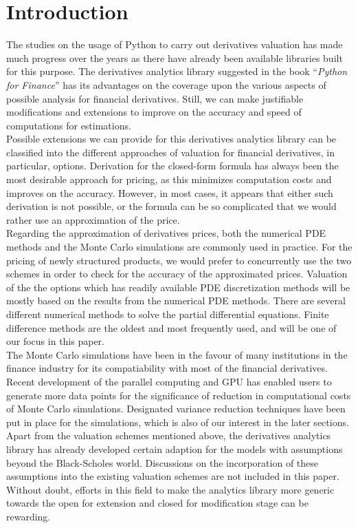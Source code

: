 \section*{Introduction}
The studies on the usage of Python to carry out derivatives valuation has made much progress over the years as there have already been available libraries built for this purpose. The derivatives analytics library suggested in the book ``\emph{Python for Finance}'' has its advantages on the coverage upon the various aspects of possible analysis for financial derivatives. Still, we can make justifiable modifications and extensions to improve on the accuracy and speed of computations for estimations. \\[1mm]
Possible extensions we can provide for this derivatives analytics library can be classified into the different approaches of valuation for financial derivatives, in particular, options. Derivation for the closed-form formula has always been the most desirable approach for pricing, as this minimizes computation costs and improves on the accuracy. However, in most cases, it appears that either such derivation is not possible, or the formula can be so complicated that we would rather use an approximation of the price.\\[1mm]
Regarding the approximation of derivatives prices, both the numerical PDE methods and the Monte Carlo simulations are commonly used in practice. For the pricing of newly structured products, we would prefer to concurrently use the two schemes in order to check for the accuracy of the approximated prices. Valuation of the the options which has readily available PDE discretization methods will be mostly based on the results from the numerical PDE methods. There are several different numerical methods to solve the partial differential equations. Finite difference methods are the oldest and most frequently used, and will be one of our focus in this paper.\\[1mm]
The Monte Carlo simulations have been in the favour of many institutions in the finance industry for its compatiability with most of the financial derivatives. Recent development of the parallel computing and GPU has enabled users to generate more data points for the significance of reduction in computational costs of Monte Carlo simulations. Designated variance reduction techniques have been put in place for the simulations, which is also of our interest in the later sections.\\[1mm]
Apart from the valuation schemes mentioned above, the derivatives analytics library has already developed certain adaption for the models with assumptions beyond the Black-Scholes world. Discussions on the incorporation of these assumptions into the existing valuation schemes are not included in this paper. Without doubt, efforts in this field to make the analytics library more generic towards the open for extension and closed for modification stage can be rewarding.

